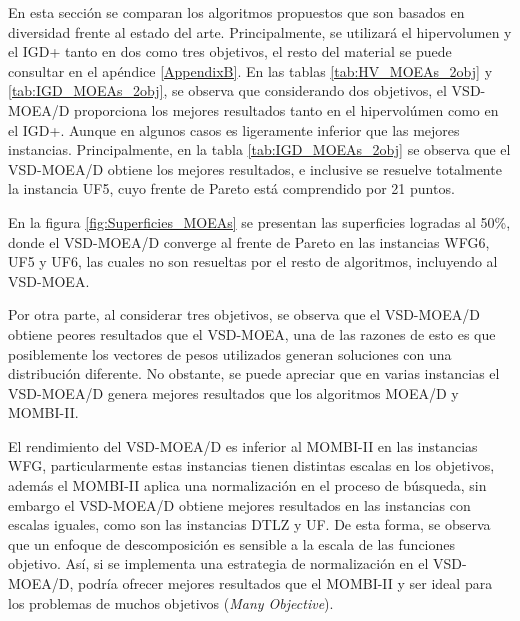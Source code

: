 En esta sección se comparan los algoritmos propuestos que son basados en diversidad frente al estado del arte.
%
Principalmente, se utilizará el hipervolumen y el IGD+ tanto en dos como tres objetivos, el resto del material se puede consultar en el apéndice \ref{AppendixB}.
%
En las tablas \ref{tab:HV_MOEAs_2obj} y \ref{tab:IGD_MOEAs_2obj}, se observa que considerando dos objetivos, el VSD-MOEA/D proporciona los mejores resultados tanto en el hipervolúmen como en el IGD+.
%
Aunque en algunos casos es ligeramente inferior que las mejores instancias.
%
Principalmente, en la tabla \ref{tab:IGD_MOEAs_2obj} se observa que el VSD-MOEA/D obtiene los mejores resultados, e inclusive se resuelve totalmente la instancia UF5, cuyo frente de Pareto está comprendido por 21 puntos.

En la figura \ref{fig:Superficies_MOEAs} se presentan las superficies logradas al 50\%, donde el VSD-MOEA/D converge al frente de Pareto en las instancias WFG6, UF5 y UF6, las cuales no son resueltas por el resto de algoritmos, incluyendo al VSD-MOEA.


Por otra parte, al considerar tres objetivos, se observa que el VSD-MOEA/D obtiene peores resultados que el VSD-MOEA, una de las razones de esto es que posiblemente los vectores de pesos utilizados generan soluciones con una distribución diferente.
%
No obstante, se puede apreciar que en varias instancias el VSD-MOEA/D genera mejores resultados que los algoritmos MOEA/D y MOMBI-II.
%

El rendimiento del VSD-MOEA/D es inferior al MOMBI-II en las instancias WFG, particularmente estas instancias tienen distintas escalas en los objetivos, además el MOMBI-II aplica una normalización en el proceso de búsqueda, sin embargo el VSD-MOEA/D obtiene mejores resultados en las instancias con escalas iguales, como son las instancias DTLZ y UF.
%
De esta forma, se observa que un enfoque de descomposición es sensible a la escala de las funciones objetivo.
%
Así, si se implementa una estrategia de normalización en el VSD-MOEA/D, podría ofrecer mejores resultados que el MOMBI-II y ser ideal para los problemas de muchos objetivos (\textit{Many Objective}).


